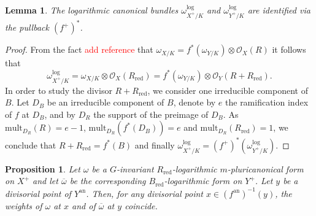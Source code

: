 \documentclass{amsart}%
\numberwithin{equation}{subsection}
\theoremstyle{plain2}
\newtheorem{lemma}[equation]{Lemma}
\newtheorem{prop}[equation]{Proposition}
\theoremstyle{definition2}
\theoremstyle{stepstyle}
\theoremstyle{point}
\theoremstyle{subpoint}
\newcommand{\redu}{\mathrm{red}}
\newcommand{\an}{\mathrm{an}}
\begin{document}
\begin{lemma} \label{lemma quotient map is log etale}
The logarithmic canonical bundles $\omega_{X^+/K}^{\log}$ and $\omega_{Y^+/K}^{\log}$ are identified via the pullback $(f^+)^*$. 
\end{lemma}
\begin{proof}
From the fact \textcolor{red}{add reference} that $\omega_{X/K}=f^*(\omega_{Y/K}) \otimes\mathcal{O}_{X}(R)$ it follows that 
$$\omega_{X^+/K}^{\log} = \omega_{X/K} \otimes\mathcal{O}_{X}(R_\redu) = f^*(\omega_{Y/K}) \otimes \mathcal{O}_{Y}(R + R_\redu).$$
In order to study the divisor $R + R_\redu$, we consider one irreducible component of $B$. Let $D_B$ be an irreducible component of $B$, denote by $e$ the ramification index of $f$ at $D_B$, and by $D_R$ the support of the preimage of $D_B$. As $\text{mult}_{D_R}(R)=e-1$, $\text{mult}_{D_R}(f^*(D_B))= e$ and $\text{mult}_{D_R}(R_\redu)=1$, we conclude that $R + R_\redu= f^*(B)$ and finally $\omega_{X^+/K}^{\log} = (f^+)^*(\omega_{Y^+/K}^{\log})$.
\end{proof}
\begin{prop} \label{prop:G inv form and corresponding weights}
Let $\omega$ be a $G$-invariant $R_\redu$-logarithmic $m$-pluricanonical form on $X^+$ and let $\overline{\omega}$ be the corresponding $B_\redu$-logarithmic form on $Y^+$. Let $y$ be a divisorial point of $Y^\an$. Then, for any divisorial point $x \in (f^\an)^{-1}(y)$, the weights of $\omega$ at $x$ and of $\overline{\omega}$ at $y$ coincide.
\end{prop}
\end{document}
